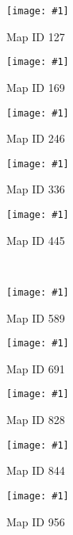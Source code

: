 \def\figw{0.19\columnwidth}%
\newcommand{\formatcaption}[1]{%
\tiny\begin{center}{#1}\end{center}}%
\newcommand{\includesnapshot}[2]{%
  \parbox{\figw}{\texttt{[image: \#1]}\\\vspace{-2.5ex}\formatcaption{#2}}}%
\includesnapshot{./exp-results/training-09x09-0127.png}{Map ID 127} 
\includesnapshot{./exp-results/training-09x09-0169.png}{Map ID 169} 
\includesnapshot{./exp-results/training-09x09-0246.png}{Map ID 246} 
\includesnapshot{./exp-results/training-09x09-0336.png}{Map ID 336} 
\includesnapshot{./exp-results/training-09x09-0445.png}{Map ID 445}\\
\vspace{1ex}
\includesnapshot{./exp-results/training-09x09-0589.png}{Map ID 589} 
\includesnapshot{./exp-results/training-09x09-0691.png}{Map ID 691} 
\includesnapshot{./exp-results/training-09x09-0828.png}{Map ID 828} 
\includesnapshot{./exp-results/training-09x09-0844.png}{Map ID 844} 
\includesnapshot{./exp-results/training-09x09-0956.png}{Map ID 956}
